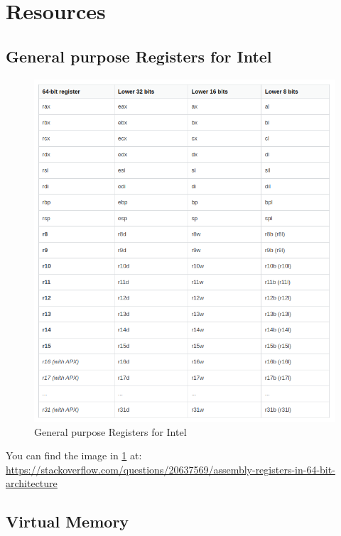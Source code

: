 \documentclass{article}
\begin{document}
\pagebreak

\section{Resources}

\subsection{General purpose Registers for Intel}

\begin{figure}[H]
    \centering
    \includegraphics[width=\textwidth]{registers.png}
    \caption{General purpose Registers for Intel}
    \label{fig:registers}
\end{figure}

You can find the image in \ref{fig:registers} at: \url{https://stackoverflow.com/questions/20637569/assembly-registers-in-64-bit-architecture}

\subsection{Virtual Memory}
\end{document}
